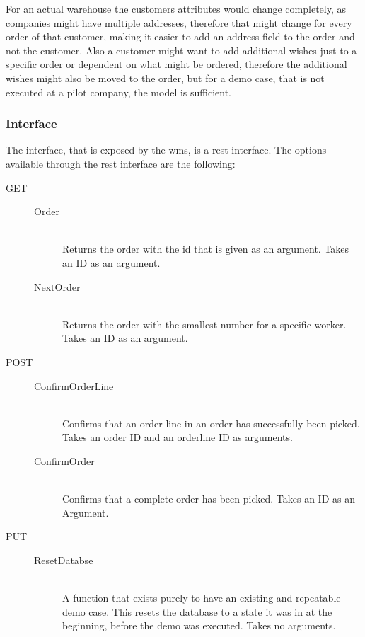 For an actual warehouse the customers attributes would change completely, as companies might have multiple addresses, therefore that might change for every order of that customer, making it easier to add an address field to the order and not the customer.  Also a customer might want to add additional wishes just to a specific order or dependent on what might be ordered, therefore the additional wishes might also be moved to the order, but for a demo case, that is not executed at a pilot company, the model is sufficient.

\subsubsection{Interface}
The interface, that is exposed by the \gls{wms}, is a \gls{rest} interface. The options available through the \gls{rest} interface are the following:
\begin{description}
	\item[GET] 
	\begin{description}
		\item[Order] \hfill \\
	Returns the order with the id that is given as an argument. Takes an ID as an argument.
		\item[NextOrder] \hfill \\
	Returns the order with the smallest number for a specific worker. Takes an ID as an argument.
	\end{description}
	\item[POST]
	\begin{description}
		\item[ConfirmOrderLine] \hfill \\
	Confirms that an order line in an order has successfully been picked. Takes an order ID and an orderline ID as arguments.
		\item[ConfirmOrder] \hfill \\
	Confirms that a complete order has been picked. Takes an ID as an Argument.
	\end{description}
	\item[PUT]
	\begin{description}
			\item[ResetDatabse] \hfill \\
	A function that exists purely to have an existing and repeatable demo case. This resets the database to a state it was in at the beginning, before the demo was executed. Takes no arguments.
	\end{description}
\end{description}

